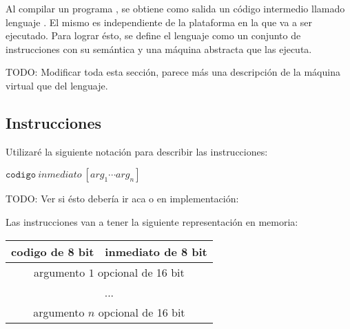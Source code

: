   Al compilar un programa \frob{}, se obtiene como salida un código
intermedio llamado lenguaje \alf{}.
  El mismo es independiente de la plataforma en la que va a ser ejecutado.
  Para lograr ésto, se define el lenguaje como un conjunto de instrucciones
con su semántica y una máquina abstracta que las ejecuta.

  TODO: Modificar toda esta sección, parece más una descripción de la máquina
virtual que del lenguaje.

\subsection{Instrucciones}

  Utilizaré la siguiente notación para describir las instrucciones:

  $\texttt{codigo}\ \textit{inmediato}\ [{arg}_1 \dotsb {arg}_n]$
 
  TODO: Ver si ésto debería ir aca o en implementación:

  Las instrucciones van a tener la siguiente representación en memoria:

  \begin{center}
      \begin{tabular}{|c|c|}
      \hline
      codigo de 8 bit & \cellcolor{gray!25}inmediato de 8 bit \\
      \hline
      \multicolumn{2}{|c|}{argumento $1$ opcional de 16 bit} \\
      \hline
      \multicolumn{2}{|c|}{...} \\
      \hline
      \multicolumn{2}{|c|}{argumento $n$ opcional de 16 bit} \\
      \hline
      \end{tabular}
  \end{center}

